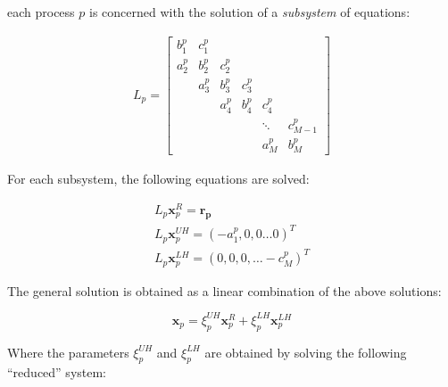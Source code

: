 \documentclass{article}
\begin{document}
    each process $p$ is concerned with the solution of a \emph{subsystem}
    of equations:

    \begin{align}
    &L_p =
    \begin{bmatrix}
        b_1^p & c_1^p \\
        a_2^p & b_2^p & c_2^p \\
              & a_3^p & b_3^p & c_3^p \\
              &       & a_4^p & b_4^p & c_4^p \\
              &       &       &       &  \ddots & c_{M-1}^p\\
              &       &       &       &     a_{M}^p  & b_{M}^p
     \end{bmatrix}&
    \end{align}

    For each subsystem, the following equations are solved:

    \begin{align}
        & L_p\boldsymbol{x}_p^R = \boldsymbol{r_p} &  \label{eqn:local-eqn-1} \\
        & L_p\boldsymbol{x}_p^{UH} = (-a_1^p, 0, 0 \hdots 0)^T &  \label{eqn:local-eqn-2} \\
        & L_p\boldsymbol{x}_p^{LH} = (0, 0, 0, \hdots -c_M^p)^T \label{eqn:local-eqn-3} &
    \end{align}

    The general solution is obtained as a linear combination of the above solutions:

    \begin{equation} \label{eqn:linear-combo}
        \boldsymbol{x}_p = {\xi}_p^{UH} \boldsymbol{x}_p^R + {\xi}_p^{LH} \boldsymbol{x}_p^{LH}
    \end{equation}

    Where the parameters ${\xi}_p^{UH}$ and ${\xi}_p^{LH}$ are obtained
    by solving the following ``reduced'' system:
\end{document}
